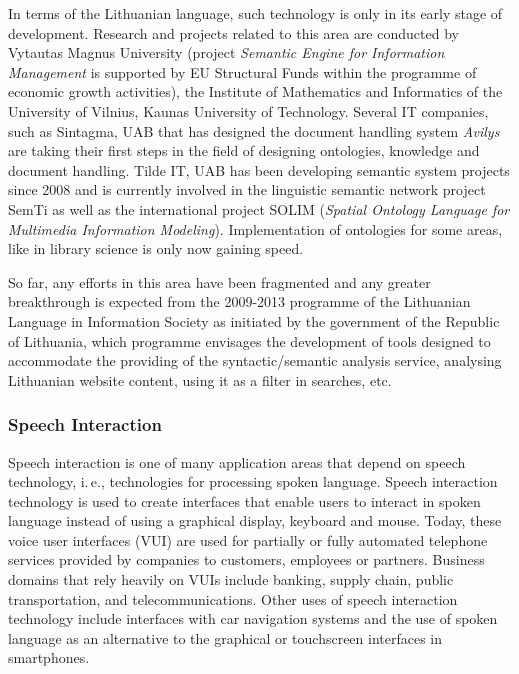 \begin{multicols}{2}
   In terms of the Lithuanian language, such technology is only in its early stage of development. Research and projects related to this area are conducted by Vytautas Magnus University (project \textit{Semantic Engine for Information Management} is supported by EU Structural Funds within the programme of economic growth activities), the Institute of Mathematics and Informatics of the University of Vilnius, Kaunas University of Technology. Several IT companies, such as Sintagma, UAB that has designed the document handling system \textit{Avilys} are taking their first steps in the field of designing ontologies, knowledge and document handling. Tilde IT, UAB has been developing semantic system projects since 2008 and is currently involved in the linguistic semantic network project SemTi as well as the international project SOLIM (\textit{Spatial Ontology Language for Multimedia Information Modeling}). Implementation of ontologies for some areas, like in library science is only now gaining speed.

    So far, any efforts in this area have been fragmented and any greater breakthrough is expected from the 2009-2013 programme of the Lithuanian Language in Information Society as initiated by the government of the Republic of Lithuania, which programme envisages the development of tools designed to accommodate the providing of the syntactic/semantic analysis service, analysing Lithuanian website content, using it as a filter in searches, etc.

\subsubsection{Speech Interaction}

Speech interaction is one of many application areas that depend on speech technology, i.\,e., technologies for processing spoken language. Speech interaction technology is used to create interfaces that enable users to interact in spoken language instead of using a graphical display, keyboard and mouse.  Today, these voice user interfaces (VUI) are used for partially or fully automated telephone services provided by companies to customers, employees or partners. Business domains that rely heavily on VUIs include banking, supply chain, public transportation, and telecommunications. Other uses of speech interaction technology include interfaces with car navigation systems and the use of spoken language as an alternative to the graphical or touchscreen interfaces in smartphones.


\end{multicols}
